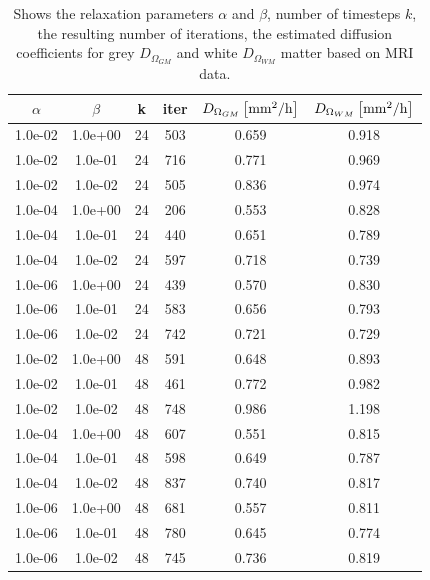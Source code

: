 \documentclass[12pt,a4paper]{article}
\begin{document}
\begin{table}
\centering
\caption{Shows the relaxation parameters $\alpha$ and $\beta$, number of timesteps $k$, the resulting number of iterations, the estimated diffusion coefficients for grey $D_{\Omega_{GM}}$ and white $D_{\Omega_{WM}}$ matter based on MRI data.}
\begin{tabular}{*{6}c}
$\alpha$ & $\beta$ & k & iter &  $ D_{\Omega_{GM}} \left[ \mathrm{mm\sp{2}/h} \right] $ & $ D_{\Omega_{WM}} \left[ \mathrm{mm\sp{2}/h} \right]$ \\
\hline
 1.0e-02 	 & 1.0e+00 	 & 24 & 503 	 & 0.659 & 0.918 \\ 
 1.0e-02 	 & 1.0e-01 	 & 24 & 716 	 & 0.771 & 0.969 \\ 
 1.0e-02 	 & 1.0e-02 	 & 24 & 505 	 & 0.836 & 0.974 \\ 
 1.0e-04 	 & 1.0e+00 	 & 24 & 206 	 & 0.553 & 0.828 \\ 
 1.0e-04 	 & 1.0e-01 	 & 24 & 440 	 & 0.651 & 0.789 \\ 
 1.0e-04 	 & 1.0e-02 	 & 24 & 597 	 & 0.718 & 0.739 \\ 
 1.0e-06 	 & 1.0e+00 	 & 24 & 439 	 & 0.570 & 0.830 \\ 
 1.0e-06 	 & 1.0e-01 	 & 24 & 583 	 & 0.656 & 0.793 \\ 
 1.0e-06 	 & 1.0e-02 	 & 24 & 742 	 & 0.721 & 0.729 \\ 
 
 1.0e-02 	 & 1.0e+00 	 & 48 & 591 	 & 0.648 & 0.893 \\ 
 1.0e-02 	 & 1.0e-01 	 & 48 & 461 	 & 0.772 & 0.982 \\ 
 1.0e-02 	 & 1.0e-02 	 & 48 & 748 	 & 0.986 & 1.198 \\ 
 1.0e-04 	 & 1.0e+00 	 & 48 & 607 	 & 0.551 & 0.815 \\ 
 1.0e-04 	 & 1.0e-01 	 & 48 & 598 	 & 0.649 & 0.787 \\ 
 1.0e-04 	 & 1.0e-02 	 & 48 & 837 	 & 0.740 & 0.817 \\
 1.0e-06 	 & 1.0e+00 	 & 48 & 681 	 & 0.557 & 0.811 \\ 
 1.0e-06 	 & 1.0e-01 	 & 48 & 780 	 & 0.645 & 0.774 \\ 
 1.0e-06 	 & 1.0e-02 	 & 48 & 745 	 & 0.736 & 0.819 \\ 



\end{tabular}
\label{Tab::Real-data}
\end{table} 
 
\end{document}
